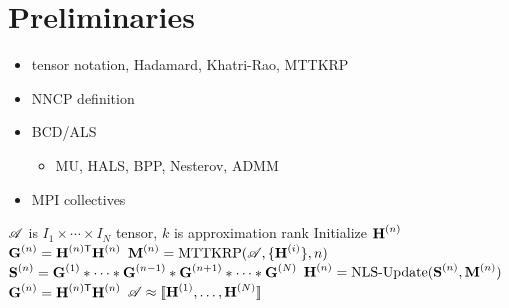 
\section{Preliminaries} 
\label{sec:prelims}

\begin{itemize}
	\item tensor notation, Hadamard, Khatri-Rao, MTTKRP
	\item NNCP definition
	\item BCD/ALS
	\begin{itemize}
		\item MU, HALS, BPP, Nesterov, ADMM
	\end{itemize}
	\item MPI collectives
\end{itemize}

\begin{algorithm}
\caption{$\CP = \text{NNCP}(\TA,k)$}
\label{alg:nncp}
\begin{algorithmic}[1]
\Require $\TA$ is $I_1\times \cdots \times I_N$ tensor, $k$ is approximation rank
\State {}
	\State Initialize $\Mn{H}{n}$ 
	\State $\Mn{G}{n} = \MnTra{H}{n}\Mn{H}{n}$
\EndFor
\State {}
	\State {}
	\State {}
	\State $\Mn{M}{n} = \text{MTTKRP}(\TA,\{\Mn{H}{i}\},n)$
	\State $\Mn{S}{n} = \Mn{G}{1} \Hada \cdots \Hada \Mn{G}{n-1} \Hada \Mn{G}{n+1} \Hada \cdots \Hada \Mn{G}{N}$
	\State $\Mn{H}{n} = \text{NLS-Update}(\Mn{S}{n},\Mn{M}{n})$
	\State $\Mn{G}{n} = \MnTra{H}{n}\Mn{H}{n}$
	\EndFor
\EndWhile
\Ensure $\TA \approx \CP$
\end{algorithmic}
\end{algorithm}

